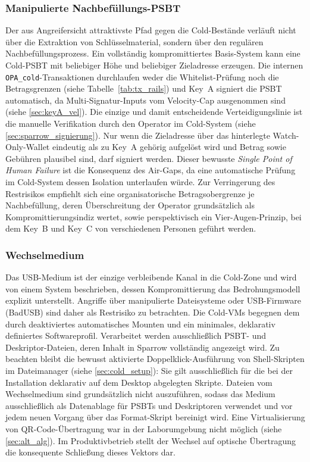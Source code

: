 \subsubsection{Manipulierte Nachbefüllungs-\ac{PSBT}}
Der aus Angreifersicht attraktivste Pfad gegen die Cold-Bestände verläuft nicht über die Extraktion von Schlüsselmaterial, sondern über den regulären Nachbefüllungsprozess.
Ein vollständig kompromittiertes Basis-System kann eine Cold-\ac{PSBT} mit beliebiger Höhe und beliebiger Zieladresse erzeugen. Die internen \texttt{OPA\_cold}-Transaktionen durchlaufen weder die
Whitelist-Prüfung noch die Betragsgrenzen (siehe Tabelle~\ref{tab:tx_rails}) und Key~A signiert die \ac{PSBT} automatisch, da Multi-Signatur-Inputs vom Velocity-Cap ausgenommen sind (siehe \ref{sec:keyA_vel}). 
Die einzige und damit entscheidende Verteidigungslinie ist die manuelle Verifikation durch den Operator im Cold-System (siehe \ref{sec:sparrow_signierung}). Nur wenn die Zieladresse über das hinterlegte Watch-Only-Wallet eindeutig als zu Key~A gehörig aufgelöst wird und Betrag sowie Gebühren plausibel sind, darf signiert werden. 
Dieser bewusste \emph{Single Point of Human Failure} ist die Konsequenz des Air-Gaps, da eine automatische Prüfung im Cold-System dessen Isolation unterlaufen würde. 
Zur Verringerung des Restrisikos empfiehlt sich eine organisatorische Betragsobergrenze je Nachbefüllung, deren Überschreitung der Operator grundsätzlich als Kompromittierungsindiz wertet, sowie
perspektivisch ein Vier-Augen-Prinzip, bei dem Key~B und Key~C von verschiedenen Personen geführt werden.

\subsubsection{Wechselmedium}
Das \ac{USB}-Medium ist der einzige verbleibende Kanal in die Cold-Zone und wird von einem System beschrieben, dessen Kompromittierung das Bedrohungsmodell explizit unterstellt. Angriffe über manipulierte Dateisysteme oder \ac{USB}-Firmware (BadUSB) sind daher als Restrisiko zu betrachten. 
Die Cold-\acp{VM} begegnen dem durch deaktiviertes automatisches Mounten und ein minimales, deklarativ definiertes Softwareprofil. Verarbeitet werden ausschließlich \ac{PSBT}- und Deskriptor-Dateien, deren Inhalt in Sparrow vollständig angezeigt wird.
Zu beachten bleibt die bewusst aktivierte Doppelklick-Ausführung von Shell-Skripten im Dateimanager (siehe \ref{sec:cold_setup}): Sie gilt ausschließlich für die bei der Installation deklarativ auf dem Desktop abgelegten Skripte. 
Dateien vom Wechselmedium sind grundsätzlich nicht auszuführen, sodass das Medium ausschließlich als
Datenablage für \acp{PSBT} und Deskriptoren verwendet und vor jedem neuen Vorgang über das Format-Skript bereinigt wird. 
Eine Virtualisierung von \ac{QR}-Code-Übertragung war in der Laborumgebung nicht möglich (siehe
\ref{sec:alt_alg}). Im Produktivbetrieb stellt der Wechsel auf optische Übertragung die konsequente Schließung dieses Vektors dar.

